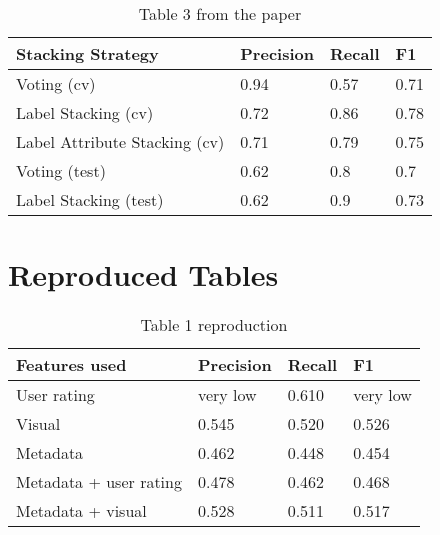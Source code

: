\documentclass[sigconf]{acmart}
\begin{document}
\begin{table}[hbt!]
  \caption*{Table 3 from the paper}
  \begin{tabular}{llll}
    \hline
    Stacking Strategy             & Precision & Recall & F1   \\ \hline
    Voting (cv)                   & 0.94      & 0.57   & 0.71 \\
    Label Stacking (cv)           & 0.72      & 0.86   & 0.78 \\
    Label Attribute Stacking (cv) & 0.71      & 0.79   & 0.75 \\
    Voting (test)                 & 0.62      & 0.8    & 0.7  \\
    Label Stacking (test)         & 0.62      & 0.9    & 0.73 \\ \hline
  \end{tabular}
\end{table}

\newpage
\section{Reproduced Tables}
\begin{table}[hbt!]
  \caption*{Table 1 reproduction}
  \begin{tabular}{llll}
    \hline
    Features used          & Precision & Recall & F1       \\ \hline
    User rating            & very low  & 0.610  & very low \\
    Visual                 & 0.545     & 0.520  & 0.526    \\
    Metadata               & 0.462     & 0.448  & 0.454    \\
    Metadata + user rating & 0.478     & 0.462  & 0.468    \\
    Metadata + visual      & 0.528     & 0.511  & 0.517    \\ \hline
  \end{tabular}
\end{table}
\end{document}
